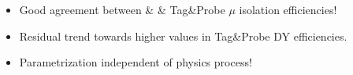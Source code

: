 \documentclass{beamer}
\begin{document}
\begin{frame}
\begin{columns}
\begin{column}{0.33\textwidth}
   \end{column}
  \end{columns}
\begin{itemize}
 \item Good agreement between \ttbar \& \wpj \& Tag\&Probe $\mu$ isolation efficiencies!
 \item Residual trend towards higher values in Tag\&Probe DY efficiencies.
 \item Parametrization independent of physics process!
\end{itemize}

\end{frame}
\end{document}
